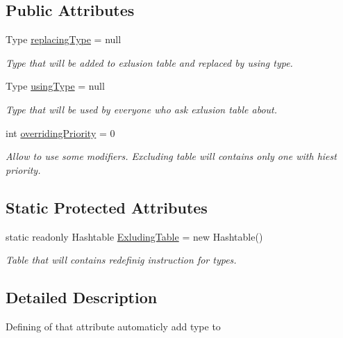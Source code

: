 \subsection*{Public Attributes}
\begin{DoxyCompactItemize}
\item 
Type \mbox{\hyperlink{class_uniform_data_operator_1_1_assemblies_management_1_1_modifiers_1_1_type_replacer_a92c79d556f9906ecfae49fd97816aa1e}{replacing\+Type}} = null
\begin{DoxyCompactList}\small\item\em Type that will be added to exlusion table and replaced by using type. \end{DoxyCompactList}\item 
Type \mbox{\hyperlink{class_uniform_data_operator_1_1_assemblies_management_1_1_modifiers_1_1_type_replacer_a9ff1766eb3660514a89255bf15c16742}{using\+Type}} = null
\begin{DoxyCompactList}\small\item\em Type that will be used by everyone who ask exlusion table about. \end{DoxyCompactList}\item 
int \mbox{\hyperlink{class_uniform_data_operator_1_1_assemblies_management_1_1_modifiers_1_1_type_replacer_a677ea9d2870e47626a39bf6e64015f18}{overriding\+Priority}} = 0
\begin{DoxyCompactList}\small\item\em Allow to use some modifiers. Excluding table will contains only one with hiest priority. \end{DoxyCompactList}\end{DoxyCompactItemize}
\subsection*{Static Protected Attributes}
\begin{DoxyCompactItemize}
\item 
static readonly Hashtable \mbox{\hyperlink{class_uniform_data_operator_1_1_assemblies_management_1_1_modifiers_1_1_type_replacer_a693a4f48eeaa0a95f46dcd06be46bc74}{Exluding\+Table}} = new Hashtable()
\begin{DoxyCompactList}\small\item\em Table that will contains redefinig instruction for types. \end{DoxyCompactList}\end{DoxyCompactItemize}


\subsection{Detailed Description}
Defining of that attribute automaticly add type to 



